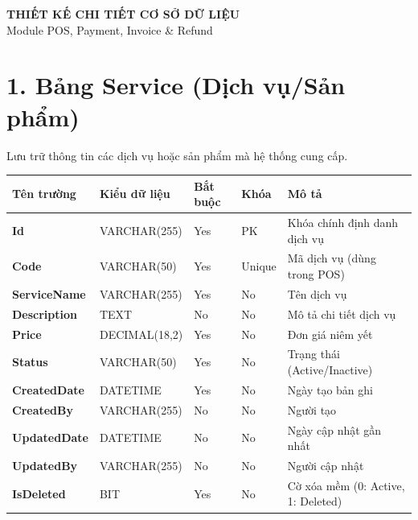 \documentclass[11pt,a4paper]{article}
\begin{document}
	
	\begin{center}
		{\LARGE \bfseries \color{primary} THIẾT KẾ CHI TIẾT CƠ SỞ DỮ LIỆU}\\[0.5em]
		{\Large \color{secondary} Module POS, Payment, Invoice \& Refund}\\[1em]
		\hrulefill
	\end{center}
	
	\vspace{1em}
	
	\renewcommand{\arraystretch}{1.2}
	
	\section{1. Bảng Service (Dịch vụ/Sản phẩm)}
	Lưu trữ thông tin các dịch vụ hoặc sản phẩm mà hệ thống cung cấp.
	
	\begin{tabularx}{\textwidth}{|>{\bfseries}p{3.5cm}|p{2.5cm}|p{1.5cm}|p{1.8cm}|X|}
		\hline
		\rowcolor{tablehead} Tên trường & Kiểu dữ liệu & Bắt buộc & Khóa & Mô tả \\ \hline
		Id & VARCHAR(255) & Yes & PK & Khóa chính định danh dịch vụ \\ \hline
		Code & VARCHAR(50) & Yes & Unique & Mã dịch vụ (dùng trong POS) \\ \hline
		ServiceName & VARCHAR(255) & Yes & No & Tên dịch vụ \\ \hline
		Description & TEXT & No & No & Mô tả chi tiết dịch vụ \\ \hline
		Price & DECIMAL(18,2) & Yes & No & Đơn giá niêm yết \\ \hline
		Status & VARCHAR(50) & Yes & No & Trạng thái (Active/Inactive) \\ \hline
		CreatedDate & DATETIME & Yes & No & Ngày tạo bản ghi \\ \hline
		CreatedBy & VARCHAR(255) & No & No & Người tạo \\ \hline
		UpdatedDate & DATETIME & No & No & Ngày cập nhật gần nhất \\ \hline
		UpdatedBy & VARCHAR(255) & No & No & Người cập nhật \\ \hline
		IsDeleted & BIT & Yes & No & Cờ xóa mềm (0: Active, 1: Deleted) \\ \hline
	\end{tabularx}
	
	\vspace{1.5em}
	
\end{document}
